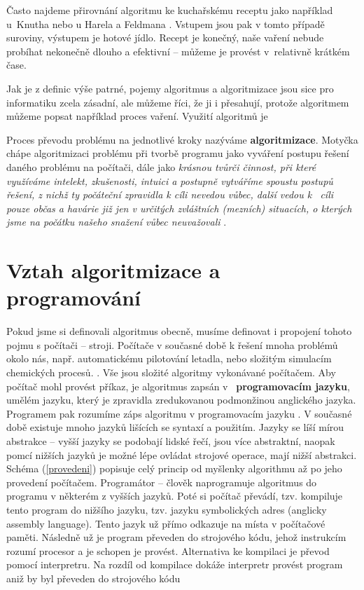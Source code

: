 \documentclass[FP,DP]{tulthesis}
\begin{document}
Často najdeme přirovnání algoritmu ke kuchařskému receptu jako například u~Knutha \citeyearpar[s.~6]{knuth} nebo u Harela a Feldmana  \citeyearpar[s.~4]{spirit}. Vstupem jsou pak v tomto případě suroviny, výstupem je hotové jídlo. Recept je konečný, naše vaření nebude probíhat nekonečně dlouho a efektivní -- můžeme je provést v~relativně krátkém čase.

Jak je z definic výše patrné, pojemy algoritmus a algoritmizace jsou sice pro informatiku zcela zásadní, ale můžeme říci, že ji i přesahují, protože algoritmem můžeme popsat například proces vaření. Využití algoritmů je 

 Proces převodu problému na jednotlivé kroky nazýváme \textbf{algoritmizace}.\citep*[s.~67]{didaktikderinformatik} Motyčka  chápe algoritmizaci problému při tvorbě programu jako  vyváření postupu řešení daného problému na počítači, dále jako \textit {krásnou tvůrči činnost, při které využíváme intelekt, zkušenosti, intuici a postupně vytváříme spoustu postupů řešení, z nichž ty počáteční zpravidla k cíli nevedou vůbec, další vedou k ~cíli pouze občas a havárie již jen v určitých zvláštních (mezních) situacích, o kterých jsme na počátku našeho snažení vůbec neuvažovali} \citeyearpar[s.~5]{motycka}.



\section{Vztah algoritmizace a programování}
Pokud jsme si definovali algoritmus obecně, musíme definovat i propojení tohoto pojmu s počítači -- stroji. Počítače v současné době k řešení mnoha problémů okolo nás, např. automatickému pilotování letadla, nebo složitým simulacím chemických procesů.  \citep[s.~49]{spirit}. Vše jsou složité algoritmy vykonávané počítačem. Aby počítač mohl provést příkaz, je algoritmus zapsán v~\textbf{ programovacím jazyku}, umělém jazyku, který je zpravidla zredukovanou podmonžinou anglického jazyka. Programem pak rozumíme záps algoritmu v programovacím jazyku \citep[s.~6]{motycka}. V současné době existuje mnoho jazyků lišících se syntaxí a použitím. Jazyky se líší mírou abstrakce -- vyšší jazyky se podobají lidské řečí, jsou více abstraktní, naopak pomcí nižších jazyků je možné lépe ovládat strojové operace, mají nižší abstrakci.  Schéma (\ref{provedeni}) popisuje celý princip od myšlenky algorithmu až po jeho provedení počítačem. Programátor -- člověk naprogramuje algoritmus do programu  v některém z vyšších jazyků. Poté si počítač převádí, tzv. kompiluje tento program do nižšího jazyku, tzv. jazyku symbolických adres (anglicky assembly language). Tento jazyk už přímo odkazuje na místa v počítačové paměti. Následně už je program převeden do strojového kódu, jehož instrukcím rozumí procesor a je schopen je provést. Alternativa ke kompilaci je převod pomocí interpretru. Na rozdíl od kompilace dokáže interpretr provést program aniž by byl převeden do strojového kódu \citep[s.~54-57]{spirit}
\end{document}
